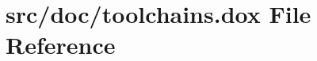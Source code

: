 \hypertarget{toolchains_8dox}{\section{src/doc/toolchains.dox File Reference}
\label{toolchains_8dox}
}
